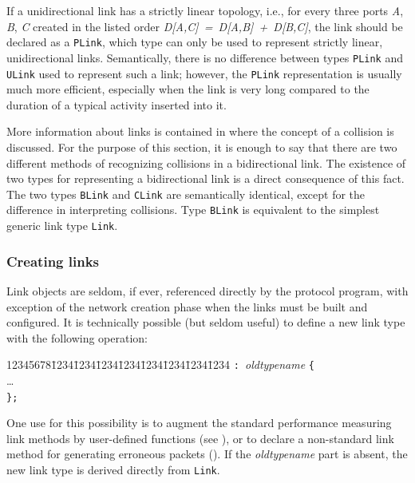 If a unidirectional link has a strictly linear topology, i.e.,
for every three ports {\em A}, {\em B}, {\em C\/} created in the listed order
{\em D[A,C]~=~D[A,B]~+~D[B,C]},
the link should be declared as a {\tt PLink}, which type
can only be used to represent strictly linear, unidirectional links.
Semantically, there is no difference between types {\tt PLink} and {\tt ULink}
used to represent such a link; however, the {\tt PLink} representation is
usually much more efficient, especially when the link is very long
compared to the duration of a typical activity inserted into it.

More information about links is contained in  where
the concept of a collision is discussed.
For the purpose of this section, it is enough to say that there are two
different methods of recognizing collisions in a bidirectional
link.
The existence of two types for representing a bidirectional link is a
direct consequence of this fact.
The two types {\tt BLink} and {\tt CLink} are semantically identical,
except for the difference in interpreting collisions.
Type {\tt BLink} is equivalent to the simplest generic link type {\tt Link}.

\subsubsection{Creating links}
\label{rm_to_li_cr}

Link objects are seldom, if ever, referenced directly by the protocol
program, with exception of the network creation phase when the links must
be built and configured.
It is technically possible (but seldom useful)
to define a new link type with the following operation:
{\tt\begin{tabbing}
12345678\=1234\=1234\=1234\=1234\=1234\=1234\=1234\=1234\kill
{} {\tt : }{\em oldtypename\/} {\tt \{} \\
\> \>\ldots \\
\> {\tt \};}
\end{tabbing}}
One use for this possibility is to augment the standard
performance measuring link methods
by user-defined functions (see ), or to declare a
non-standard link method for generating erroneous packets
().
If the {\em oldtypename\/} part is absent,
the new link type is derived directly from {\tt Link}.

